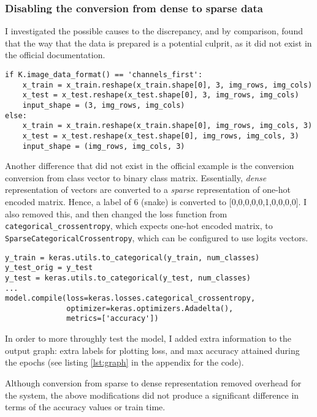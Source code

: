 \documentclass{article}
\begin{document}
\subsubsection{Disabling the conversion from dense to sparse data}
I investigated the possible causes to the discrepancy, and by comparison, found that the way that the data is prepared is a potential culprit, as it did not exist in the official documentation.

\begin{lstlisting}
if K.image_data_format() == 'channels_first':
    x_train = x_train.reshape(x_train.shape[0], 3, img_rows, img_cols)
    x_test = x_test.reshape(x_test.shape[0], 3, img_rows, img_cols)
    input_shape = (3, img_rows, img_cols)
else:
    x_train = x_train.reshape(x_train.shape[0], img_rows, img_cols, 3)
    x_test = x_test.reshape(x_test.shape[0], img_rows, img_cols, 3)
    input_shape = (img_rows, img_cols, 3)
\end{lstlisting}

Another difference that did not exist in the official example is the conversion conversion from class vector to binary class matrix. Essentially, \emph{dense} representation of vectors are converted to a \emph{sparse} representation of one-hot encoded matrix. Hence, a label of 6 (snake) is converted to [0,0,0,0,0,1,0,0,0,0]. I also removed this, and then changed the loss function from \texttt{categorical\_crossentropy}, which expects one-hot encoded matrix, to \texttt{SparseCategoricalCrossentropy}, which can be configured to use logits vectors.\autocite{logits}

\begin{lstlisting}
y_train = keras.utils.to_categorical(y_train, num_classes)
y_test_orig = y_test
y_test = keras.utils.to_categorical(y_test, num_classes)
...
model.compile(loss=keras.losses.categorical_crossentropy,
              optimizer=keras.optimizers.Adadelta(),
              metrics=['accuracy'])
\end{lstlisting}

In order to more throughly test the model, I added extra information to the output graph: extra labels for plotting loss, and max accuracy attained during the epochs (see listing \ref{lst:graph} in the appendix for the code).

Although conversion from sparse to dense representation removed overhead for the system\autocite[24]{bengio12}, the above modifications did not produce a significant difference in terms of the accuracy values or train time.
\end{document}
